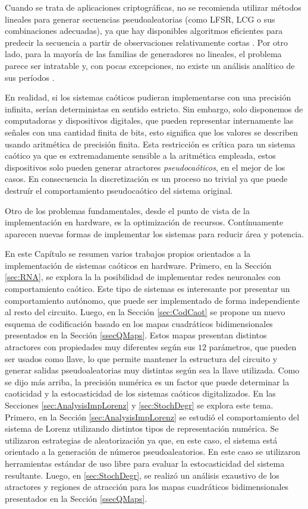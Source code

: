 Cuando se trata de aplicaciones criptográficas, no se recomienda utilizar métodos lineales para generar secuencias pseudoaleatorias (como LFSR, LCG o sus combinaciones adecuadas), ya que hay disponibles algoritmos eficientes para predecir la secuencia a partir de observaciones relativamente cortas \cite{Boyar1989, Plumstead1982}.
Por otro lado, para la mayoría de las familias de generadores no lineales, el problema parece ser intratable y, con pocas excepciones, no existe un análisis analítico de sus períodos \cite{kocarev2011}.

En realidad, si los sistemas caóticos pudieran implementarse con una precisión infinita, serían deterministas en sentido estricto.
Sin embargo, solo disponemos de computadoras y dispositivos digitales, que pueden representar internamente las señales con una cantidad finita de bits, esto significa que los valores se describen usando aritmética de precisión finita.
Esta restricción es crítica para un sistema caótico ya que es extremadamente sensible a la aritmética empleada, estos dispositivos solo pueden generar atractores \textsl{pseudocaóticos}, en el mejor de los casos.
En consecuencia la discretización es un proceso no trivial ya que puede destruír el comportamiento pseudocaótico del sistema original.

Otro de los problemas fundamentales, desde el punto de vista de la implementación en hardware, es la optimización de recursos.
Contínuamente aparecen nuevas formas de implementar los sistemas para reducir área y potencia.

En este Capítulo se resumen varios trabajos propios orientados a la implementación de sistemas caóticos en hardware.
Primero, en la Sección \ref{sec:RNA}, se explora la la posibilidad de implementar redes neuronales con comportamiento caótico.
Este tipo de sistemas es interesante por presentar un comportamiento autónomo, que puede ser implementado de forma independiente al resto del circuito.
Luego, en la Sección \ref{sec:CodCaot} se propone un nuevo esquema de codificación basado en los mapas cuadráticos bidimensionales presentados en la Sección \ref{ssecQMaps}.
Estos mapas presentan distintos atractores con propiedades muy diferentes según sus $12$ parámetros, que pueden ser usados como llave, lo que permite mantener la estructura del circuito y generar salidas pseudoaleatorias muy distintas según sea la llave utilizada.
Como se dijo más arriba, la precisión numérica es un factor que puede determinar la caoticidad y la estocasticidad de los sistemas caóticos digitalizados.
En las Secciones \ref{sec:AnalysisImpLorenz} y \ref{sec:StochDegr} se explora este tema.
Primero, en la Sección \ref{sec:AnalysisImpLorenz} se estudió el comportamiento del sistema de Lorenz utilizando distintos tipos de representación numérica.
Se utilizaron estrategias de aleatorización ya que, en este caso, el sistema está orientado a la generación de números pseudoaleatorios.
En este caso se utilizaron herramientas estándar de uso libre para evaluar la estocasticidad del sistema resultante.
Luego, en \ref{sec:StochDegr}, se realizó un análisis exaustivo de los atractores y regiones de atracción para los mapas cuadráticos bidimensionales presentados en la Sección \ref{ssecQMaps}.